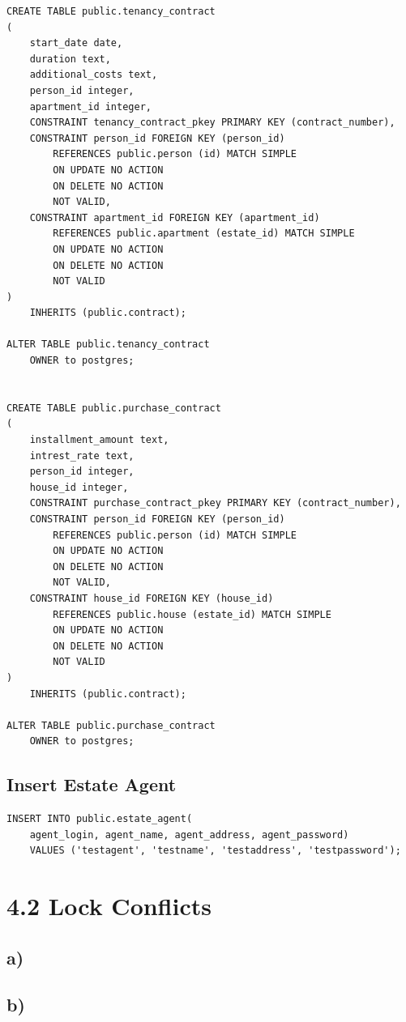 \documentclass[ngerman]{dis-template-add}
\begin{document}
\begin{verbatim}
CREATE TABLE public.tenancy_contract
(
    start_date date,
    duration text,
    additional_costs text,
    person_id integer,
    apartment_id integer,
    CONSTRAINT tenancy_contract_pkey PRIMARY KEY (contract_number),
    CONSTRAINT person_id FOREIGN KEY (person_id)
        REFERENCES public.person (id) MATCH SIMPLE
        ON UPDATE NO ACTION
        ON DELETE NO ACTION
        NOT VALID,
    CONSTRAINT apartment_id FOREIGN KEY (apartment_id)
        REFERENCES public.apartment (estate_id) MATCH SIMPLE
        ON UPDATE NO ACTION
        ON DELETE NO ACTION
        NOT VALID
)
    INHERITS (public.contract);

ALTER TABLE public.tenancy_contract
    OWNER to postgres;


CREATE TABLE public.purchase_contract
(
    installment_amount text,
    intrest_rate text,
    person_id integer,
    house_id integer,
    CONSTRAINT purchase_contract_pkey PRIMARY KEY (contract_number),
    CONSTRAINT person_id FOREIGN KEY (person_id)
        REFERENCES public.person (id) MATCH SIMPLE
        ON UPDATE NO ACTION
        ON DELETE NO ACTION
        NOT VALID,
    CONSTRAINT house_id FOREIGN KEY (house_id)
        REFERENCES public.house (estate_id) MATCH SIMPLE
        ON UPDATE NO ACTION
        ON DELETE NO ACTION
        NOT VALID
)
    INHERITS (public.contract);

ALTER TABLE public.purchase_contract
    OWNER to postgres;
\end{verbatim}


\subsection*{Insert Estate Agent}

\begin{verbatim}
INSERT INTO public.estate_agent(
    agent_login, agent_name, agent_address, agent_password)
    VALUES ('testagent', 'testname', 'testaddress', 'testpassword');
\end{verbatim}



\section*{4.2 Lock Conflicts}

\subsection*{a)}

\subsection*{b)}
\end{document}
